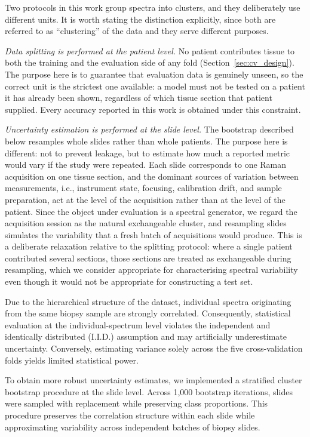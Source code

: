 Two protocols in this work group spectra into clusters, and they deliberately use different
units. It is worth stating the distinction explicitly, since both are referred to as
``clustering'' of the data and they serve different purposes.

\emph{Data splitting is performed at the patient level.} No patient contributes tissue to both
the training and the evaluation side of any fold (Section~\ref{sec:cv_design}). The purpose here
is to guarantee that evaluation data is genuinely unseen, so the correct unit is the strictest
one available: a model must not be tested on a patient it has already been shown, regardless of
which tissue section that patient supplied. Every accuracy reported in this work is obtained
under this constraint.

\emph{Uncertainty estimation is performed at the slide level.} The bootstrap described below
resamples whole slides rather than whole patients. The purpose here is different: not to prevent
leakage, but to estimate how much a reported metric would vary if the study were repeated. Each
slide corresponds to one Raman acquisition on one tissue section, and the dominant sources of
variation between measurements, i.e., instrument state, focusing, calibration drift, and sample
preparation, act at the level of the acquisition rather than at the level of the patient. Since
the object under evaluation is a spectral generator, we regard the acquisition session as the
natural exchangeable cluster, and resampling slides simulates the variability that a fresh batch
of acquisitions would produce. This is a deliberate relaxation relative to the splitting
protocol: where a single patient contributed several sections, those sections are treated as
exchangeable during resampling, which we consider appropriate for characterising spectral
variability even though it would not be appropriate for constructing a test set.

Due to the hierarchical structure of the dataset, individual spectra originating from the same
biopsy sample are strongly correlated. Consequently, statistical evaluation at the
individual-spectrum level violates the independent and identically distributed (I.I.D.)
assumption and may artificially underestimate uncertainty. Conversely, estimating variance solely
across the five cross-validation folds yields limited statistical power.

To obtain more robust uncertainty estimates, we implemented a stratified cluster bootstrap
procedure at the slide level. Across 1,000 bootstrap iterations, slides were sampled with
replacement while preserving class proportions. This procedure preserves the correlation
structure within each slide while approximating variability across independent batches of biopsy
slides.


